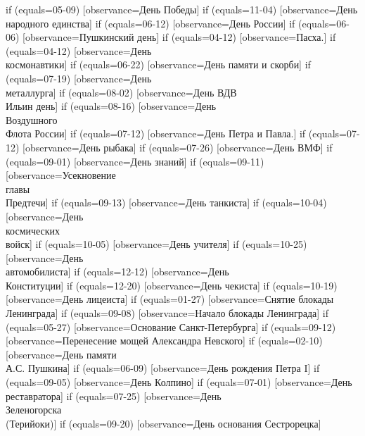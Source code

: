 {  if (equals=05-09) [observance=День Победы]
  if (equals=11-04) [observance=День народного единства]
  if (equals=06-12) [observance=День России]
  if (equals=06-06) [observance=Пушкинский день]
  if (equals=04-12) [observance=Пасха.]
  if (equals=04-12) [observance=День\\ космонавтики]
  if (equals=06-22) [observance=День памяти и скорби]
  if (equals=07-19) [observance=День\\ металлурга]
  if (equals=08-02) [observance=День ВДВ\\ Ильин день]
  if (equals=08-16) [observance=День\\ Воздушного\\ Флота России]
  if (equals=07-12) [observance=День Петра и Павла.]
  if (equals=07-12) [observance=День рыбака]
  if (equals=07-26) [observance=День ВМФ]
  if (equals=09-01) [observance=День знаний]
  if (equals=09-11) [observance=Усекновение\\ главы\\ Предтечи]
  if (equals=09-13) [observance=День танкиста]
  if (equals=10-04) [observance=День\\ космических\\ войск]
  if (equals=10-05) [observance=День учителя]
  if (equals=10-25) [observance=День\\ автомобилиста]
  if (equals=12-12) [observance=День\\ Конституции]
  if (equals=12-20) [observance=День чекиста]
  if (equals=10-19) [observance=День лицеиста]
  if (equals=01-27) [observance=Снятие блокады Ленинграда]
  if (equals=09-08) [observance=Начало блокады Ленинграда]
  if (equals=05-27) [observance=Основание Санкт-Петербурга]
  if (equals=09-12) [observance=Перенесение мощей Александра Невского]
  if (equals=02-10) [observance=День памяти\\ А.С. Пушкина]
  if (equals=06-09) [observance=День рождения Петра I]
  if (equals=09-05) [observance=День Колпино]
  if (equals=07-01) [observance=День\\ реставратора]
  if (equals=07-25) [observance=День\\ Зеленогорска\\ (Терийоки)]
  if (equals=09-20) [observance=День основания Сестрорецка]
}
